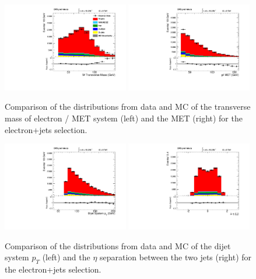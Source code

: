 \begin{figure}[h!t]
  {\centering
    \includegraphics[width=0.49\textwidth]{figs/n-1_plots_el/el_W_mt.pdf}
    \includegraphics[width=0.49\textwidth]{figs/n-1_plots_el/el_event_met_pfmet.pdf}
    \caption{Comparison of the distributions from data and MC of the transverse mass
     of electron / MET system (left) and the MET (right) for the
      electron+jets selection. 
      }
    \label{fig:elec_W_Mt}}
\end{figure}
\begin{figure}[h!t]
  {\centering
    \includegraphics[width=0.49\textwidth]{figs/n-1_plots_el/el_dijet_pt.pdf}
    \includegraphics[width=0.49\textwidth]{figs/n-1_plots_el/el_deltaeta_jj.pdf}
    \caption{Comparison of the distributions from data and MC of the dijet system
     $p_{T}$ (left) and the $\eta $ separation between the two jets (right) for the
      electron+jets selection. 
      }
    \label{fig:elec_dijet}}
\end{figure}
